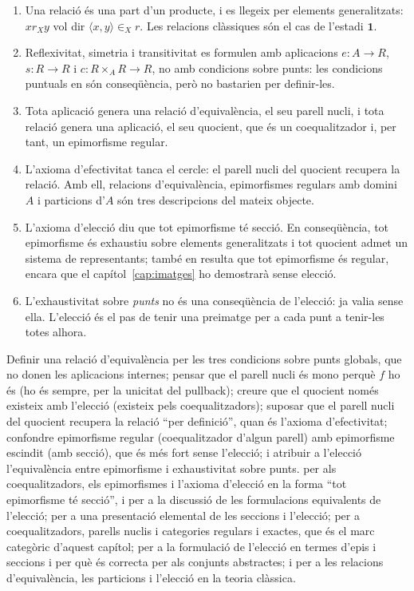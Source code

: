 \begin{resumcap}
\begin{enumerate}
  \item Una relació és una part d'un producte, i es llegeix per elements generalitzats: \(x\mathrel{r_X}y\) vol dir \(\langle x,y\rangle\in_X r\). Les relacions clàssiques són el cas de l'estadi \(\mathbf1\).
  \item Reflexivitat, simetria i transitivitat es formulen amb aplicacions \(e\colon A\to R\), \(s\colon R\to R\) i \(c\colon R\times_AR\to R\), no amb condicions sobre punts: les condicions puntuals en són conseqüència, però no bastarien per definir-les.
  \item Tota aplicació genera una relació d'equivalència, el seu parell nucli, i tota relació genera una aplicació, el seu quocient, que és un coequalitzador i, per tant, un epimorfisme regular.
  \item L'axioma d'efectivitat tanca el cercle: el parell nucli del quocient recupera la relació. Amb ell, relacions d'equivalència, epimorfismes regulars amb domini \(A\) i particions d'\(A\) són tres descripcions del mateix objecte.
  \item L'axioma d'elecció diu que tot epimorfisme té secció. En conseqüència, tot epimorfisme és exhaustiu sobre elements generalitzats i tot quocient admet un sistema de representants; també en resulta que tot epimorfisme és regular, encara que el capítol~\ref{cap:imatges} ho demostrarà sense elecció.
  \item L'exhaustivitat sobre \emph{punts} no és una conseqüència de l'elecció: ja valia sense ella. L'elecció és el pas de tenir una preimatge per a cada punt a tenir-les totes alhora.
\end{enumerate}
 Definir una relació d'equivalència per les tres condicions sobre punts globals, que no donen les aplicacions internes; pensar que el parell nucli és mono perquè \(f\) ho és (ho és sempre, per la unicitat del pullback); creure que el quocient només existeix amb l'elecció (existeix pels coequalitzadors); suposar que el parell nucli del quocient recupera la relació \enquote{per definició}, quan és l'axioma d'efectivitat; confondre epimorfisme regular (coequalitzador d'algun parell) amb epimorfisme escindit (amb secció), que és més fort sense l'elecció; i atribuir a l'elecció l'equivalència entre epimorfisme i exhaustivitat sobre punts.
 \cite[cap.~4 i apèndix~B]{lawvere-rosebrugh} per als coequalitzadors, els epimorfismes i l'axioma d'elecció en la forma \enquote{tot epimorfisme té secció}, i per a la discussió de les formulacions equivalents de l'elecció; \cite[article~V, sessions~28--29]{lawvere-schanuel} per a una presentació elemental de les seccions i l'elecció; \cite[§§3.4, 5.5 i 9.8]{awodey} per a coequalitzadors, parells nuclis i categories regulars i exactes, que és el marc categòric d'aquest capítol; \cite[pàg.~12]{bell2006} per a la formulació de l'elecció en termes d'epis i seccions i per què és correcta per als conjunts abstractes; i \cite[§§7, 15--16]{halmos} per a les relacions d'equivalència, les particions i l'elecció en la teoria clàssica.
\end{resumcap}
